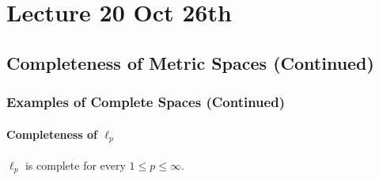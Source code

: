 \documentclass[notoc,notitlepage]{tufte-book}
\begin{document}




\chapter{Lecture 20 Oct 26th}%
\label{chp:lecture_20_oct_26th}

\section{Completeness of Metric Spaces (Continued)}%
\label{sec:completeness_of_metric_spaces_continued}

\subsection{Examples of Complete Spaces (Continued)}%
\label{sub:examples_of_complete_spaces_continued}

\subsubsection{Completeness of $\ell_p$}%
\label{ssub:completeness_of_ell_p_}

\begin{thm}\label{thm:completeness_of_ell_p_}
  $\ell_p$ is complete for every $1 \leq p \leq \infty$.
\end{thm}
\end{document}
